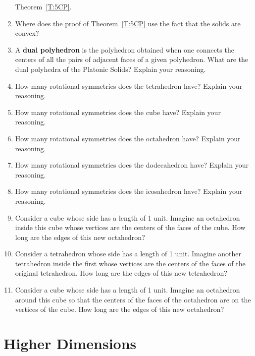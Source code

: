 \begin{enumerate}
  Theorem~\ref{T:5CP}.
\item Where does the proof of Theorem~\ref{T:5CP} use the fact that
  the solids are convex?
\item A \textbf{dual polyhedron} is the
  polyhedron obtained when one connects the centers of all the pairs
  of adjacent faces of a given polyhedron. What are the dual polyhedra
  of the Platonic Solids? Explain your reasoning.
\item How many rotational symmetries does the tetrahedron have?
  Explain your reasoning.
\item How many rotational symmetries does the cube have?
  Explain your reasoning.
\item How many rotational symmetries does the octahedron have?
  Explain your reasoning.
\item How many rotational symmetries does the dodecahedron have?
  Explain your reasoning.
\item How many rotational symmetries does the icosahedron have?
  Explain your reasoning.
\item Consider a cube whose side has a length of 1 unit. Imagine an
  octahedron inside this cube whose vertices are the centers of the
  faces of the cube. How long are the edges of this new octahedron?
\item Consider a tetrahedron whose side has a length of 1
  unit. Imagine another tetrahedron inside the first whose vertices are the
  centers of the faces of the original tetrahedron. How long are the
  edges of this new tetrahedron?
\item Consider a cube whose side has a length of 1 unit. Imagine an
  octahedron around this cube so that the centers of the faces of the
  octahedron are on the vertices of the cube. How long are the edges
  of this new octahedron?
\end{enumerate}



\newpage


\section{Higher Dimensions}


